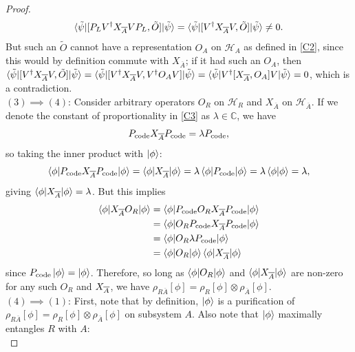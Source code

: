 \documentclass[12pt,a4paper]{report}
\numberwithin{equation}{section}
\newcommand{\Pc}{P_{\text{code}}}
\newcommand{\ol}[1]{\overline{#1}}
\theoremstyle{definition}
\theoremstyle{theorem}
\theoremstyle{theorem}
\theoremstyle{example}
\theoremstyle{definition}
\begin{document}
\begin{proof}
	\begin{equation}
		\braket{\tilde{\psi}|[P_{L}V^{\dagger} X_{\ol{A}}VP_{L},\tilde{O}]|\tilde{\psi}}=\braket{\tilde{\psi}|[V^{\dagger}X_{\ol{A}}V,\tilde{O}]|\tilde{\psi}}\neq 0.
	\end{equation}
	But such an $\tilde{O}$ cannot have a representation $O_{A}$ on $\mathcal{H}_{A}$ as defined in \ref{C2}, since this would by definition commute with $X_{\ol{A}}$; if it had such an $O_{A}$, then $\braket{\tilde{\psi}|[V^{\dagger}X_{\ol{A}}V,\tilde{O}]|\tilde{\psi}}=\braket{\tilde{\psi}|[V^{\dagger}X_{\ol{A}}V,V^{\dagger}O_{A}V]|\tilde{\psi}}=\braket{\tilde{\psi}|V^{\dagger}[X_{\ol{A}},O_{A}]V|\tilde{\psi}}=0$, which is a contradiction.\\
	$(3)\implies (4)$: Consider arbitrary operators $O_{R}$ on $\mathcal{H}_{R}$ and $X_{\overline{A}}$ on $\mathcal{H}_{\overline{A}}$. If we denote the constant of proportionality in \ref{C3} as $\lambda\in\mathbb{C}$, we have
	\begin{equation}
		\Pc\Xabar\Pc=\lambda\Pc,
	\end{equation}
	so taking the inner product with $\ket{\phi}$:
	\begin{equation}
		\braket{\phi|\Pc\Xabar\Pc|\phi}=\braket{\phi|\Xabar|\phi}=\lambda\braket{\phi|\Pc|\phi}=\lambda\braket{\phi|\phi}=\lambda,
	\end{equation}
	giving $\braket{\phi|X_{\overline{A}}|\phi}=\lambda$. But this implies
	\begin{equation}
		\begin{aligned}
			\braket{\phi|\Xabar O_{R}|\phi}&=\braket{\phi|\Pc O_{R}\Xabar\Pc|\phi}\\&=\braket{\phi|O_{R}\Pc\Xabar\Pc|\phi}\\&=\braket{\phi|O_{R}\lambda\Pc|\phi}\\&=\braket{\phi|O_{R}|\phi}\braket{\phi|\Xabar|\phi}
		\end{aligned}
	\end{equation} 
	since $\Pc\ket{\phi}=\ket{\phi}$. Therefore, so long as $\braket{\phi|O_{R}|\phi}$ and $\braket{\phi|X_{\overline{A}}|\phi}$ are non-zero for any such $O_{R}$ and $X_{\overline{A}}$, we have $\rho_{R\overline{A}}[\phi]=\rho_{R}[\phi]\otimes\rho_{\overline{A}}[\phi]$.\\
	$(4)\implies (1)$: First, note that by definition, $\ket{\phi}$ is a purification of $\rho_{R\overline{A}}[\phi]=\rho_{R}[\phi]\otimes\rho_{\overline{A}}[\phi]$ on subsystem $A$. Also note that $\ket{\phi}$ maximally entangles $R$ with $A$:
	\begin{equation}

\end{equation}
\end{proof}
\end{document}
